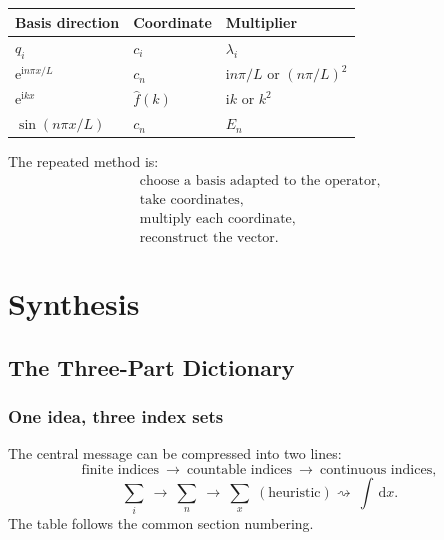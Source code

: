 \documentclass[11pt,a5paper,oneside,openany]{scrreprt}
\theoremstyle{notes}
\theoremstyle{definitions}
\newcommand{\dd}{\,\mathrm{d}}
\newcommand{\e}{\mathrm{e}}
\begin{document}
\begin{summarybox}
\centering
\small
\renewcommand{\arraystretch}{1.45}
\begin{tabularx}{\linewidth}{@{}>{\raggedright\arraybackslash}X
  >{\centering\arraybackslash}p{.20\linewidth}
  >{\centering\arraybackslash}p{.29\linewidth}@{}}
\textbf{Basis direction} & \textbf{Coordinate} & \textbf{Multiplier}\\
\midrule
$q_i$ & $c_i$ & $\lambda_i$\\
$\e^{\mathrm i n\pi x/L}$ & $c_n$ &
 $\mathrm i n\pi/L$ or $(n\pi/L)^2$\\
$\e^{\mathrm i kx}$ & $\widehat f(k)$ &
 $\mathrm i k$ or $k^2$\\
$\sin(n\pi x/L)$ & $c_n$ & $E_n$
\end{tabularx}
\end{summarybox}

The repeated method is:
\[
 \boxed{
 \begin{gathered}
 \text{choose a basis adapted to the operator},\\
 \text{take coordinates},\\
 \text{multiply each coordinate},\\
 \text{reconstruct the vector}.
 \end{gathered}}
\]

\part{Synthesis}
\chapter{The Three-Part Dictionary}

\section*{One idea, three index sets}

The central message can be compressed into two lines:
\[
 \boxed{\text{finite indices}
 \ \longrightarrow\ \text{countable indices}
 \ \longrightarrow\ \text{continuous indices}},
\]
\[
 \boxed{\sum_i\ \longrightarrow\ \sum_n\
 \longrightarrow\ \sum_x\;(\text{heuristic})
 \rightsquigarrow\ \int\dd x}.
\]
The table follows the common section numbering.
\end{document}
